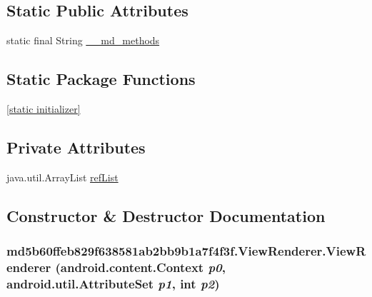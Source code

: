 \subsection*{Static Public Attributes}
\begin{CompactItemize}
\item 
static final String \hyperlink{classmd5b60ffeb829f638581ab2bb9b1a7f4f3f_1_1_view_renderer_9d61e0ff54f2c1a789912ef2d2e97d9d}{\_\-\_\-md\_\-methods}
\end{CompactItemize}
\subsection*{Static Package Functions}
\begin{CompactItemize}
\item 
\hyperlink{classmd5b60ffeb829f638581ab2bb9b1a7f4f3f_1_1_view_renderer_ec3c17e00fab196999735579e51f409f}{\mbox{[}static initializer\mbox{]}}
\end{CompactItemize}
\subsection*{Private Attributes}
\begin{CompactItemize}
\item 
java.util.ArrayList \hyperlink{classmd5b60ffeb829f638581ab2bb9b1a7f4f3f_1_1_view_renderer_0833259dc6ac4a65396cf7f3fedd9f17}{refList}
\end{CompactItemize}


\subsection{Constructor \& Destructor Documentation}
\hypertarget{classmd5b60ffeb829f638581ab2bb9b1a7f4f3f_1_1_view_renderer_7824854b6d56615c217020e835a18df7}{
\subsubsection[{ViewRenderer}]{\setlength{\rightskip}{0pt plus 5cm}md5b60ffeb829f638581ab2bb9b1a7f4f3f.ViewRenderer.ViewRenderer (android.content.Context {\em p0}, \/  android.util.AttributeSet {\em p1}, \/  int {\em p2})}}
\label{classmd5b60ffeb829f638581ab2bb9b1a7f4f3f_1_1_view_renderer_7824854b6d56615c217020e835a18df7}


